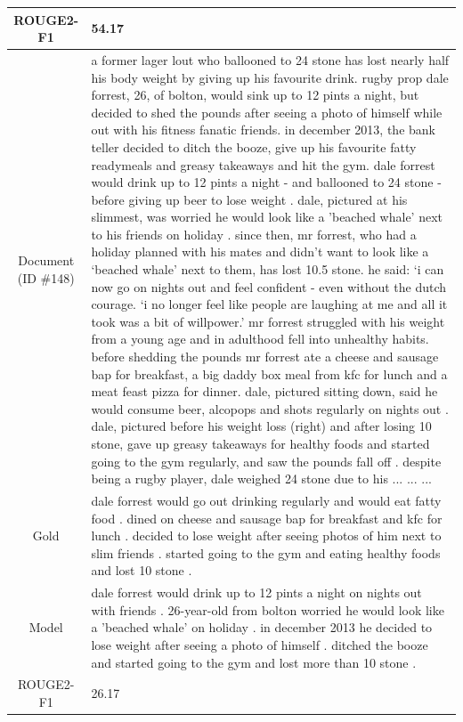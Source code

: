 \begin{table}[bth!]
\begin{tabular}{c|p{}}
\\ \hline
ROUGE2-F1 & 
54.17
\\ \hline
\makecell{Document\\(ID \#148)} & 
a former lager lout who ballooned to 24 stone has lost nearly half his body weight by giving up his favourite drink. rugby prop dale forrest, 26, of bolton, would sink up to 12 pints a night, but decided to shed the pounds after seeing a photo of himself while out with his fitness fanatic friends. in december 2013, the bank teller decided to ditch the booze, give up his favourite fatty readymeals and greasy takeaways and hit the gym. dale forrest would drink up to 12 pints a night - and ballooned to 24 stone - before giving up beer to lose weight . dale, pictured at his slimmest, was worried he would look like a 'beached whale' next to his friends on holiday . since then, mr forrest, who had a holiday planned with his mates and didn’t want to look like a ‘beached whale’ next to them, has lost 10.5 stone. he said: ‘i can now go on nights out and feel confident - even without the dutch courage. ‘i no longer feel like people are laughing at me and all it took was a bit of willpower.’ mr forrest struggled with his weight from a young age and in adulthood fell into unhealthy habits. before shedding the pounds mr forrest ate a cheese and sausage bap for breakfast, a big daddy box meal from kfc for lunch and a meat feast pizza for dinner. dale, pictured sitting down, said he would consume beer, alcopops and shots regularly on nights out . dale, pictured before his weight loss (right) and after losing 10 stone, gave up greasy takeaways for healthy foods and started going to the gym regularly, and saw the pounds fall off . despite being a rugby player, dale weighed 24 stone due to his ... ... ... 
\\ \hline
Gold & 
dale forrest would go out drinking regularly and would eat fatty food . dined on cheese and sausage bap for breakfast and kfc for lunch . decided to lose weight after seeing photos of him next to slim friends . started going to the gym and eating healthy foods and lost 10 stone .
\\ \hline
Model & 
dale forrest would drink up to 12 pints a night on nights out with friends . 26-year-old from bolton worried he would look like a 'beached whale' on holiday . in december 2013 he decided to lose weight after seeing a photo of himself . ditched the booze and started going to the gym and lost more than 10 stone .
\\ \hline
ROUGE2-F1 & 
26.17
\\ \hline

\end{tabular}
\end{table}
